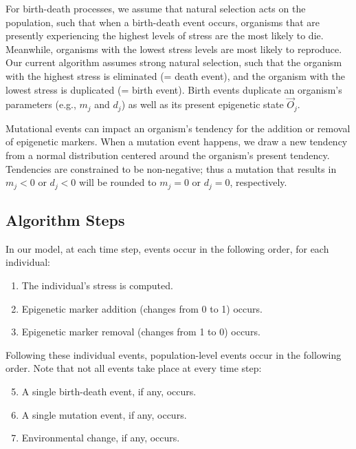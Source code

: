 \documentclass{article}
\begin{document}
For birth-death processes, we assume that natural selection acts on the population, such that when a birth-death event occurs, organisms that are presently experiencing the highest levels of stress are the most likely to die. Meanwhile, organisms with the lowest stress levels are most likely to reproduce. Our current algorithm assumes strong natural selection, such that the organism with the highest stress is eliminated (= death event), and the organism with the lowest stress is duplicated (= birth event). Birth events duplicate an organism's parameters (e.g., $m_j$ and $d_j$) as well as its present epigenetic state $\vec{O}_j$.

Mutational events can impact an organism's tendency for the addition or removal of epigenetic markers. When a mutation event happens, we draw a new tendency from a normal distribution centered around the organism's present tendency. Tendencies are constrained to be non-negative; thus a mutation that results in $m_j<0$ or $d_j<0$ will be rounded to $m_j=0$ or $d_j=0$, respectively.


\subsection{Algorithm Steps}
In our model, at each time step, events occur in the following order, for each individual:
\begin{enumerate}
    \item The individual's stress is computed.
    \item Epigenetic marker addition (changes from 0 to 1) occurs.
    \item Epigenetic marker removal (changes from 1 to 0) occurs.
\end{enumerate}

Following these individual events, population-level events occur in the following order. Note that not all events take place at every time step:
\begin{enumerate}
  \setcounter{enumi}{4}
    \item A single birth-death event, if any, occurs.
    \item A single mutation event, if any, occurs.
    \item Environmental change, if any, occurs.
\end{enumerate}
\end{document}
